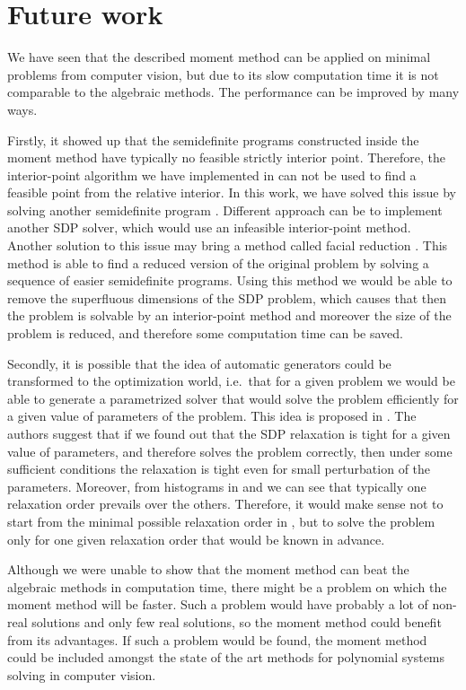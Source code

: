 \section{Future work}
We have seen that the described moment method can be applied on minimal problems from computer vision, but due to its slow computation time it is not comparable to the algebraic methods.
The performance can be improved by many ways.

Firstly, it showed up that the semidefinite programs constructed inside the moment method have typically no feasible strictly interior point.
Therefore, the interior-point algorithm we have implemented in  can not be used to find a feasible point from the relative interior.
In this work, we have solved this issue by solving another semidefinite program .
Different approach can be to implement another SDP solver, which would use an infeasible interior-point method.
Another solution to this issue may bring a method called facial reduction \cite{facial}.
This method is able to find a reduced version of the original problem by solving a sequence of easier semidefinite programs.
Using this method we would be able to remove the superfluous dimensions of the SDP problem, which causes that then the problem is solvable by an interior-point method and moreover the size of the problem is reduced, and therefore some computation time can be saved.

Secondly, it is possible that the idea of automatic generators \cite{autogen, larsson} could be transformed to the optimization world, i.e.\ that for a given problem we would be able to generate a parametrized solver that would solve the problem efficiently for a given value of parameters of the problem.
This idea is proposed in \cite{SDPstability}.
The authors suggest that if we found out that the SDP relaxation is tight for a given value of parameters, and therefore solves the problem correctly, then under some sufficient conditions the relaxation is tight even for small perturbation of the parameters.
Moreover, from histograms in  and  we can see that typically one relaxation order prevails over the others.
Therefore, it would make sense not to start from the minimal possible relaxation order in , but to solve the problem only for one given relaxation order that would be known in advance.

Although we were unable to show that the moment method can beat the algebraic methods in computation time, there might be a problem on which the moment method will be faster.
Such a problem would have probably a lot of non-real solutions and only few real solutions, so the moment method could benefit from its advantages.
If such a problem would be found, the moment method could be included amongst the state of the art methods for polynomial systems  solving in computer vision.

